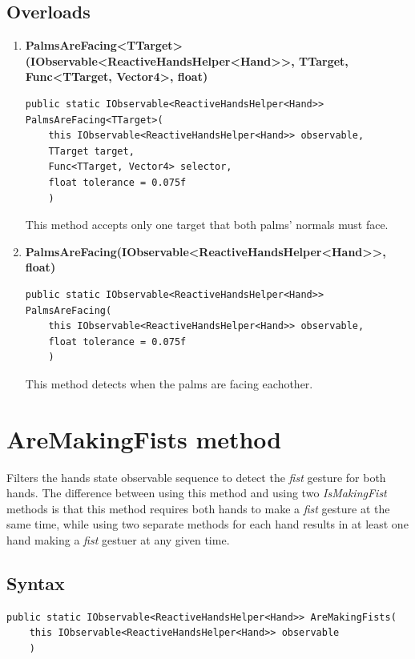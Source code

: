 \documentclass[12pt,a4paper,twoside]{report}
\begin{document}
\subsection{Overloads}
\begin{enumerate}
  \item \textbf{PalmsAreFacing<TTarget>(IObservable<ReactiveHandsHelper<Hand>{}>, TTarget, Func<TTarget, Vector4>, float)}
\begin{lstlisting}[caption=Declaration]
  public static IObservable<ReactiveHandsHelper<Hand>> PalmsAreFacing<TTarget>(
    this IObservable<ReactiveHandsHelper<Hand>> observable,
    TTarget target,
    Func<TTarget, Vector4> selector,
    float tolerance = 0.075f
    )
\end{lstlisting}
  This method accepts only one target that both palms' normals must face.

  \item \textbf{PalmsAreFacing(IObservable<ReactiveHandsHelper<Hand>{}>, float)}
\begin{lstlisting}[caption=Declaration]
  public static IObservable<ReactiveHandsHelper<Hand>> PalmsAreFacing(
    this IObservable<ReactiveHandsHelper<Hand>> observable,
    float tolerance = 0.075f
    )
\end{lstlisting}
  This method detects when the palms are facing eachother.

\end{enumerate}

\section{AreMakingFists method}
Filters the hands state observable sequence to detect the \textit{fist} gesture for both hands. The difference between using this method and using two \textit{IsMakingFist} methods is that this method requires both hands to make a \textit{fist} gesture at the same time, while using two separate methods for each hand results in at least one hand making a \textit{fist} gestuer at any given time.

\subsection{Syntax}
\begin{lstlisting}[caption=Declaration]
  public static IObservable<ReactiveHandsHelper<Hand>> AreMakingFists(
    this IObservable<ReactiveHandsHelper<Hand>> observable
    )
\end{lstlisting}
\end{document}
